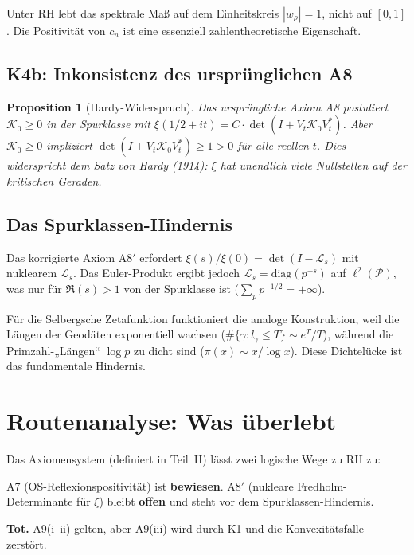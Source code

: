 \documentclass[12pt,a4paper]{article}
\newtheorem{proposition}[theorem]{Proposition}
\theoremstyle{definition}
\theoremstyle{remark}
\newcommand{\PP}{\mathcal{P}}
\begin{document}
Unter RH lebt das spektrale Maß auf dem Einheitskreis $|w_\rho| = 1$, nicht auf $[0,1]$. Die Positivität von $c_n$ ist eine essenziell zahlentheoretische Eigenschaft.

\subsection{K4b: Inkonsistenz des ursprünglichen A8}

\begin{proposition}[Hardy-Widerspruch]
\label{prop:hardy}
Das ursprüngliche Axiom A8 postuliert $\mathcal{K}_0 \geq 0$ in der Spurklasse mit $\xi(1/2+it) = C\cdot\det(I + V_t\mathcal{K}_0V_t^*)$. Aber $\mathcal{K}_0 \geq 0$ impliziert $\det(I + V_t\mathcal{K}_0V_t^*) \geq 1 > 0$ für alle reellen $t$. Dies widerspricht dem Satz von Hardy (1914): $\xi$ hat unendlich viele Nullstellen auf der kritischen Geraden.
\end{proposition}

\subsection{Das Spurklassen-Hindernis}

Das korrigierte Axiom A8$'$ erfordert $\xi(s)/\xi(0) = \det(I - \mathcal{L}_s)$ mit nuklearem $\mathcal{L}_s$. Das Euler-Produkt ergibt jedoch $\mathcal{L}_s = \mathrm{diag}(p^{-s})$ auf $\ell^2(\PP)$, was nur für $\Re(s) > 1$ von der Spurklasse ist ($\sum_p p^{-1/2} = +\infty$).

Für die Selbergsche Zetafunktion funktioniert die analoge Konstruktion, weil die Längen der Geodäten exponentiell wachsen ($\#\{\gamma: l_\gamma \leq T\} \sim e^T/T$), während die Primzahl-„Längen“ $\log p$ zu dicht sind ($\pi(x) \sim x/\log x$). Diese Dichtelücke ist das fundamentale Hindernis.


\section{Routenanalyse: Was überlebt}
\label{sec:routes}

Das Axiomensystem (definiert in Teil~II) lässt zwei logische Wege zu RH zu:

\begin{description}[font=\bfseries,leftmargin=2em]
  \item[Route 1 (A7 + A8$'$):] A7 (OS-Reflexionspositivität) ist \textbf{bewiesen}. A8$'$ (nukleare Fredholm-Determinante für $\xi$) bleibt \textbf{offen} und steht vor dem Spurklassen-Hindernis.
  \item[Route 2 (A9):] \textbf{Tot.} A9(i--ii) gelten, aber A9(iii) wird durch K1 und die Konvexitätsfalle zerstört.
\end{description}
\end{document}
